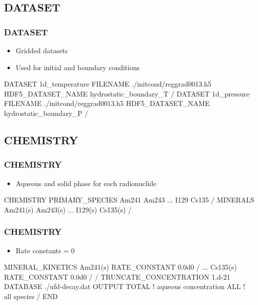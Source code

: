 \documentclass{beamer}
\newcommand\bluecomment[1]{{{\color{blue} #1}}}
\begin{document}
\subsection{DATASET}

\begin{frame}[fragile]\frametitle{DATASET}

\begin{itemize}
  \item Gridded datasets
  \item Used for initial and boundary conditions
\end{itemize}

\begin{semiverbatim}
DATASET 1d_temperature
  FILENAME ./initcond/reggrad0013.h5
  HDF5_DATASET_NAME hydrostatic_boundary_T
/
DATASET 1d_pressure
  FILENAME ./initcond/reggrad0013.h5
  HDF5_DATASET_NAME hydrostatic_boundary_P
/
\end{semiverbatim}

\end{frame}

\subsection{CHEMISTRY}

\begin{frame}[fragile]\frametitle{CHEMISTRY}

\begin{itemize}
  \item Aqueous and solid phase for each radionuclide
\end{itemize}

\begin{semiverbatim}
CHEMISTRY
  PRIMARY_SPECIES
    Am241
    Am243
    \bluecomment{...}
    I129
    Cs135
  /
  MINERALS
    Am241(s)
    Am243(s)
    \bluecomment{...}
    I129(s)
    Cs135(s)
  /
\end{semiverbatim}

\end{frame}

\begin{frame}[fragile]\frametitle{CHEMISTRY}

\begin{itemize}
  \item Rate constants = 0
\end{itemize}

\begin{semiverbatim}\small
  MINERAL_KINETICS
    Am241(s)
      RATE_CONSTANT 0.0d0
    /
    \bluecomment{...}
    Cs135(s)
      RATE_CONSTANT 0.0d0
    /
  /
  TRUNCATE_CONCENTRATION 1.d-21
  DATABASE ./ufd-decay.dat
  OUTPUT
    TOTAL \bluecomment{! aqueous concentration}
    ALL   \bluecomment{! all species}
  /
END
\end{semiverbatim}

\end{frame}
\end{document}
